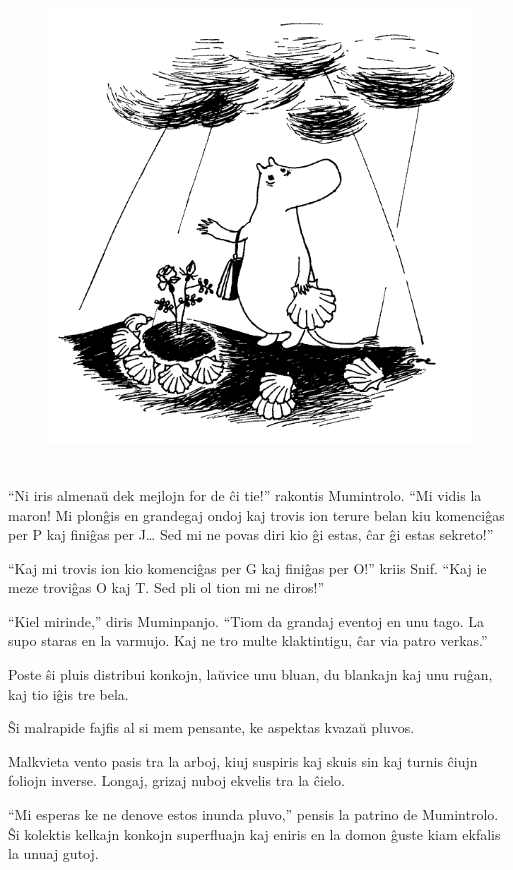 \begin{figure}[htbp]
\centering
\includegraphics[width=350pt,height=361pt]{1-9.png}
\caption{}
\label{1-9}
\end{figure}

``Ni iris almenaŭ dek mejlojn for de ĉi tie!'' rakontis Mumintrolo. ``Mi vidis la maron! Mi plonĝis en grandegaj ondoj kaj trovis ion terure belan kiu komenciĝas per P kaj finiĝas per J{\ldots} Sed mi ne povas diri kio ĝi estas, ĉar ĝi estas sekreto!''

``Kaj mi trovis ion kio komenciĝas per G kaj finiĝas per O!'' kriis Snif. ``Kaj ie meze troviĝas O kaj T. Sed pli ol tion mi ne diros!''

``Kiel mirinde,'' diris Muminpanjo. ``Tiom da grandaj eventoj en unu tago. La supo staras en la varmujo. Kaj ne tro multe klaktintigu, ĉar via patro verkas.''

Poste ŝi pluis distribui konkojn, laŭvice unu bluan, du blankajn kaj unu ruĝan, kaj tio iĝis tre bela.

Ŝi malrapide fajfis al si mem pensante, ke aspektas kvazaŭ pluvos.

Malkvieta vento pasis tra la arboj, kiuj suspiris kaj skuis sin kaj turnis ĉiujn foliojn inverse. Longaj, grizaj nuboj ekvelis tra la ĉielo.

``Mi esperas ke ne denove estos inunda pluvo,'' pensis la patrino de Mumintrolo. Ŝi kolektis kelkajn konkojn superfluajn kaj eniris en la domon ĝuste kiam ekfalis la unuaj gutoj.

